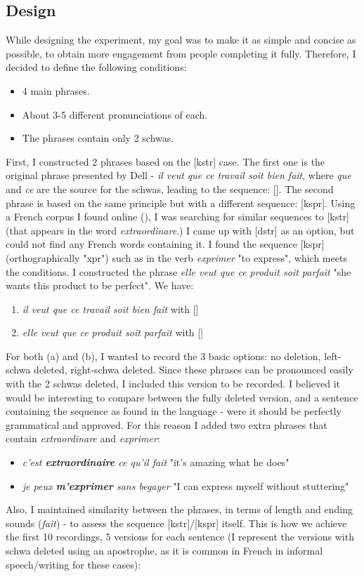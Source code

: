 \documentclass{article}
\begin{document}
\subsection{Design}
While designing the experiment, my goal was to make it as simple and concise as possible, to obtain more engagement from people completing it fully. Therefore, I decided to define the following conditions:
\begin{itemize}
  \item 4 main phrases.
  \item About 3-5 different pronunciations of each.
  \item The phrases contain only 2 schwas.
\end{itemize}
First,  I constructed 2 phrases based on the [kstr] case. The first one is the original phrase presented by Dell - \textit{il veut que ce travail soit bien fait}, where \textit{que} and \textit{ce} are the source for the schwas, leading to the sequence: [].
The second phrase is based on the same principle but with a different sequence: [kspr]. Using a French corpus I found online (\cite{corpus}), I was searching for similar sequences to [kstr] (that appears in the word \textit{extraordinare}.) I came up with [dstr] as an option, but could not find any French words containing it. I found the sequence [kspr] (orthographically "xpr") such as in the verb \textit{exprimer} "to express", which meets the conditions. I constructed the phrase \textit{elle veut que ce produit soit parfait} "she wants this product to be perfect". We have:
\begin{enumerate} [label=(\alph*)]
  \item \textit{il veut que ce travail soit bien fait} with []
  \item \textit{elle veut que ce produit soit parfait} with []
\end{enumerate}
For both (a) and (b), I wanted to record the 3 basic options: no deletion, left-schwa deleted, right-schwa deleted. Since these phrases can be pronounced easily with the 2 schwas deleted,  I included this version to be recorded. I believed it would be interesting to compare between the fully deleted version, and a sentence containing the sequence as found in the language - were it should be perfectly grammatical and approved.  For this reason I added two extra phrases that contain \textit{extraordinare} and \textit{exprimer}:
\begin{itemize}
  \item \textit{c’est \textbf{extraordinaire} ce qu’il fait} "it's amazing what he does"
  \item \textit{je peux \textbf{m’exprimer} sans begayer} "I can express myself without stuttering"
\end{itemize}
Also, I maintained similarity between the phrases, in terms of length and ending sounds (\textit{fait}) - to assess the sequence [kstr]/[kspr] itself.
This is how we achieve the first 10 recordings, 5 versions for each sentence (I represent the versions with schwa deleted using an apostrophe,  as it is common in French in informal speech/writing for these cases):
\end{document}
